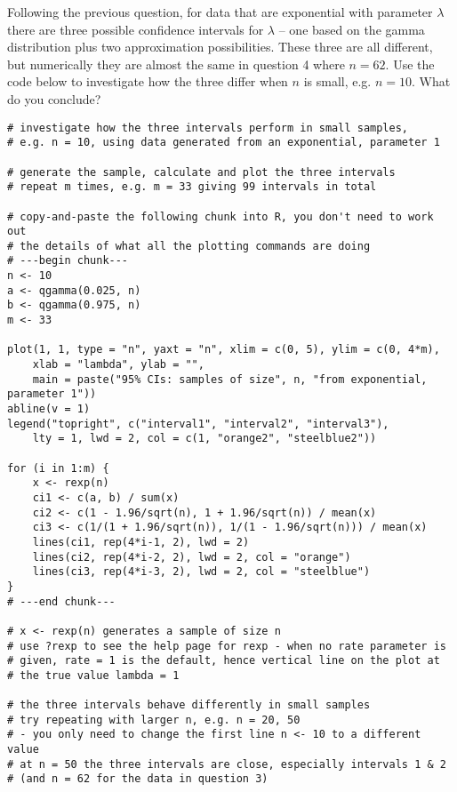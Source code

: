 \documentclass[answers]{exam}
\begin{document}
\begin{questions}
\question%
Following the previous question, for data that are exponential with parameter $\lambda$ there are three possible confidence intervals for $\lambda$ -- one based on the gamma distribution plus two approximation possibilities. These three are all different, but numerically they are almost the same in question 4 where $n=62$. Use the code below to investigate how the three differ when $n$ is small, e.g. $n=10$. What do you conclude? \begin{verbatim}
# investigate how the three intervals perform in small samples,
# e.g. n = 10, using data generated from an exponential, parameter 1

# generate the sample, calculate and plot the three intervals
# repeat m times, e.g. m = 33 giving 99 intervals in total

# copy-and-paste the following chunk into R, you don't need to work out
# the details of what all the plotting commands are doing
# ---begin chunk---
n <- 10
a <- qgamma(0.025, n)
b <- qgamma(0.975, n)
m <- 33

plot(1, 1, type = "n", yaxt = "n", xlim = c(0, 5), ylim = c(0, 4*m),
    xlab = "lambda", ylab = "",
    main = paste("95% CIs: samples of size", n, "from exponential, parameter 1"))
abline(v = 1)
legend("topright", c("interval1", "interval2", "interval3"),
    lty = 1, lwd = 2, col = c(1, "orange2", "steelblue2"))

for (i in 1:m) {
    x <- rexp(n)
    ci1 <- c(a, b) / sum(x)
    ci2 <- c(1 - 1.96/sqrt(n), 1 + 1.96/sqrt(n)) / mean(x)
    ci3 <- c(1/(1 + 1.96/sqrt(n)), 1/(1 - 1.96/sqrt(n))) / mean(x)
    lines(ci1, rep(4*i-1, 2), lwd = 2)
    lines(ci2, rep(4*i-2, 2), lwd = 2, col = "orange")
    lines(ci3, rep(4*i-3, 2), lwd = 2, col = "steelblue")
}
# ---end chunk---

# x <- rexp(n) generates a sample of size n
# use ?rexp to see the help page for rexp - when no rate parameter is
# given, rate = 1 is the default, hence vertical line on the plot at
# the true value lambda = 1

# the three intervals behave differently in small samples
# try repeating with larger n, e.g. n = 20, 50
# - you only need to change the first line n <- 10 to a different value
# at n = 50 the three intervals are close, especially intervals 1 & 2
# (and n = 62 for the data in question 3)
\end{verbatim}




\end{questions}
\end{document}
